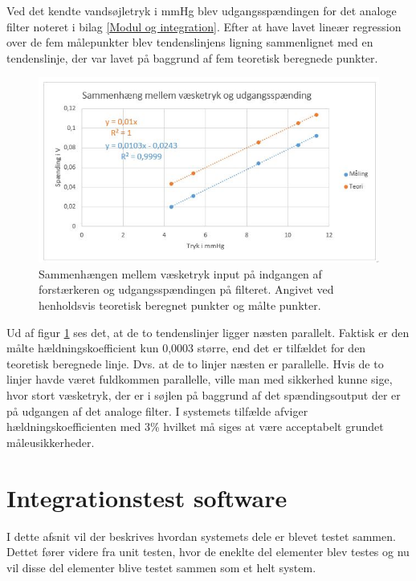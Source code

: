 Ved det kendte vandsøjletryk i mmHg blev udgangsspændingen for det analoge filter noteret i bilag \ref{Modul og integration}. Efter at have lavet lineær regression over de fem målepunkter blev tendenslinjens ligning sammenlignet med en tendenslinje, der var lavet på baggrund af fem teoretisk beregnede punkter. 

\begin{figure}[H]
	\centering
	\includegraphics[width=1\textwidth]{Figurer/Hardware/VaesketrykUdgangsspaending}
	\caption{Sammenhængen mellem væsketryk input på indgangen af forstærkeren og udgangsspændingen på filteret. Angivet ved henholdsvis teoretisk beregnet punkter og målte punkter.}
	\label{fig:Vaesketryk}
\end{figure}

Ud af figur \ref{fig:Vaesketryk} ses det, at de to tendenslinjer ligger næsten parallelt. Faktisk er den målte hældningskoefficient kun 0,0003 større, end det er tilfældet for den teoretisk beregnede linje. Dvs. at de to linjer næsten er parallelle. Hvis de to linjer havde været fuldkommen parallelle, ville man med sikkerhed kunne sige, hvor stort væsketryk, der er i søjlen på baggrund af det spændingsoutput der er på udgangen af det analoge filter. I systemets tilfælde afviger hældningskoefficienten med 3\% hvilket må siges at være acceptabelt grundet måleusikkerheder.

\section{Integrationstest software}
I dette afsnit vil der beskrives hvordan systemets dele er blevet testet sammen. Dettet fører videre fra unit testen, hvor de eneklte del elementer blev testes og nu vil disse del elementer blive testet sammen som et helt system. 

